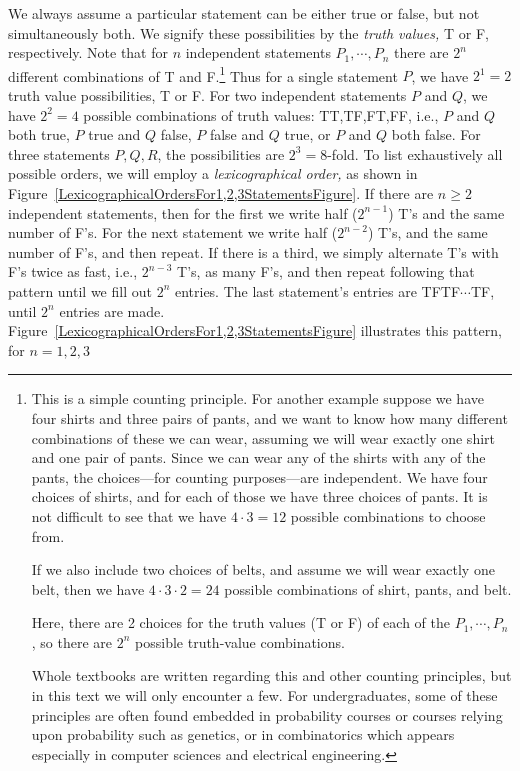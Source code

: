 We always assume a
particular statement can be either true or false, but
not simultaneously both.\footnotemark
{}
We signify these possibilities by the {\it truth values,} T or F,
respectively.  Note that for $n$ independent
statements $P_1,\cdots,P_n$ there are
$2^n$ different combinations of T and F.\footnote{%
This is a simple counting principle.  For another
example suppose we have 
four shirts and three pairs of pants, and
we want to know how many different combinations
of these we can wear,
assuming we will wear exactly one shirt and one pair of pants.  Since we can
wear any of the shirts with any of the pants,
the choices---for counting purposes---are independent.
We have four choices of shirts, and for each of those we have
three choices of pants.
It is not difficult to see that we have $4\cdot3=12$ possible
combinations to choose from.

If we also include two choices of belts, and assume we will wear exactly
one belt, then we have $4\cdot3\cdot2=24$ possible combinations
of shirt, pants, and belt.

Here, there are 2 choices for the truth values (T or F) of 
each of the $P_1,\cdots,P_n$, so there are $2^n$ possible
truth-value combinations.

Whole textbooks are written regarding this and other
counting principles, but in this text
we will only encounter a few.  For undergraduates, some of these principles
are often found embedded in probability courses or courses relying upon
probability such as genetics, or in combinatorics which appears especially 
in computer sciences and electrical engineering. 
} 
Thus for a single statement $P$, we have $2^1=2$ truth value
possibilities, T or F.
For two independent statements $P$ and $Q$, we have
$2^2=4$ possible combinations of truth values:
TT,TF,FT,FF, i.e., $P$ and $Q$ both true, $P$ true and $Q$
false, $P$ false and $Q$ true, or $P$ and $Q$ both false.
For three statements $P,Q,R$, the possibilities are $2^3=8$-fold.
To list exhaustively all possible orders, we will employ
a {\it lexicographical order, }as shown in 
Figure~\ref{LexicographicalOrdersFor1,2,3StatementsFigure}.
If there are $n\ge2$ independent statements, then 
for the first we write half ($2^{n-1}$) T's and the same number of F's.
For the next statement we write half ($2^{n-2}$) T's, and the same number
of F's, and then repeat.  If there is a third, we simply
alternate T's with F's twice as fast, i.e., $2^{n-3}$ T's, as
many F's, and then repeat following that pattern until we fill out $2^n$
entries.  The last statement's entries are TFTF$\cdots$TF,
until $2^n$ entries are made. 
Figure~\ref{LexicographicalOrdersFor1,2,3StatementsFigure}
illustrates this pattern, for $n=1,2,3$

